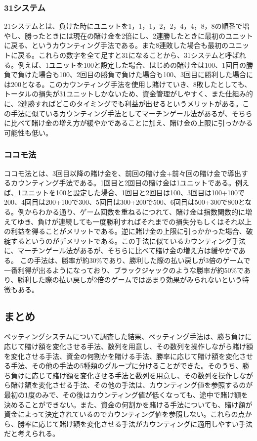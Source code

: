 \subsubsection{31システム}
21システムとは、負けた時にユニットを1，1，1，2，2，4，4，8，8の順番で増やし、勝ったときには現在の賭け金を2倍にし、2連勝したときに最初のユニットに戻る、というカウンティング手法である。また8連敗した場合も最初のユニットに戻る。これらの数字を全て足すと31になることから、31システムと呼ばれる。例えば、1ユニットを100と設定した場合、はじめの賭け金は100、1回目の勝負で負けた場合も100、2回目の勝負で負けた場合も100、3回目に勝利した場合には200となる。このカウンティング手法を使用し賭けていき、8敗したとしても、トータルの損失が31ユニットしかないため、資金管理がしやすく、また仕組み的に、2連勝すればどこのタイミングでも利益が出せるというメリットがある。この手法に似ているカウンティング手法としてマーチンゲール法があるが、そちらに比べて賭け金の増え方が緩やかであることに加え、賭け金の上限に引っかかる可能性も低い。
\subsubsection{ココモ法}
ココモ法とは、3回目以降の賭け金を、前回の賭け金+前々回の賭け金で導出するカウンティング手法である。1回目と2回目の賭け金は1ユニットである。例えば、1ユニットを100と設定した場合、1回目と2回目は100、3回目は100+100で200、4回目は200+100で300、5回目は300+200で500、6回目は500+300で800となる。例からわかる通り、ゲーム回数を重ねるにつれて、賭け金は指数関数的に増えてゆき、負けが連続しても一度勝利すればそれまでの損失分もしくはそれ以上の利益を得ることがメリットである。逆に賭け金の上限に引っかかった場合、破綻するというのがデメリットである。この手法に似ているカウンティング手法に、マーチンゲール法があるが、そちらに比べて賭け金の増え方は緩やかである。
この手法は、勝率が約30\%であり、勝利した際の払い戻しが3倍のゲームで一番利得が出るようになっており、ブラックジャックのような勝率が約50\%であり、勝利した際の払い戻しが2倍のゲームではあまり効果がみられないという特徴もある。

\subsection{まとめ}
ベッティングシステムについて調査した結果、ベッティング手法は、勝ち負けに応じて賭け額を変化させる手法、数列を用意し、その数列を操作しながら賭け額を変化させる手法、資金の何割かを賭ける手法、勝率に応じて賭け額を変化させる手法、その他の手法の5種類のグループに分けることができた。そのうち、勝ち負けに応じて賭け額を変化させる手法と数列を用意し、その数列を操作しながら賭け額を変化させる手法、その他の手法は、カウンティング値を参照するのが最初の1度のみで、その後はカウンティング値が低くなっても、途中で賭け額を決めることができない。また、資金の何割かを賭ける手法についても、賭け額が資金によって決定されているのでカウンティング値を参照しない。これらの点から、勝率に応じて賭け額を変化させる手法がカウンティングに適用しやすい手法だと考えられる。
